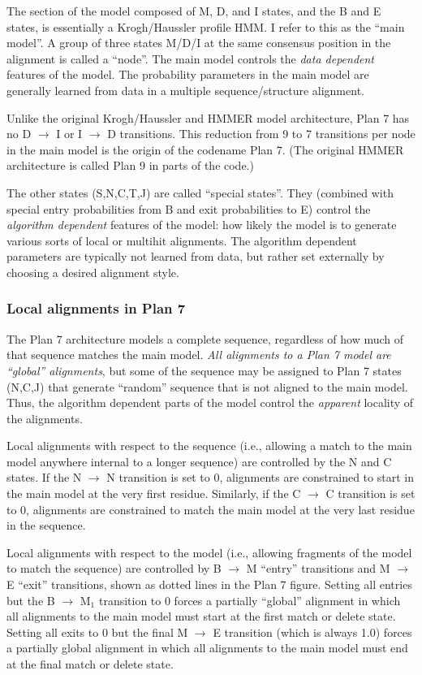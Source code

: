 The section of the model composed of M, D, and I states, and the B and
E states, is essentially a Krogh/Haussler profile HMM. I refer to this
as the ``main model''. A group of three states M/D/I at the same
consensus position in the alignment is called a ``node''. The main
model controls the \textit{data dependent} features of the model.  The
probability parameters in the main model are generally learned from
data in a multiple sequence/structure alignment.

Unlike the original Krogh/Haussler and HMMER model architecture, Plan
7 has no D $\rightarrow$ I or I $\rightarrow$ D transitions. This
reduction from 9 to 7 transitions per node in the main model is the
origin of the codename Plan 7. (The original HMMER architecture is
called Plan 9 in parts of the code.)

The other states (S,N,C,T,J) are called ``special states''. They
(combined with special entry probabilities from B and exit
probabilities to E) control the \textit{algorithm dependent} features
of the model: how likely the model is to generate various sorts of
local or multihit alignments. The algorithm dependent parameters are
typically not learned from data, but rather set externally by choosing
a desired alignment style.

\subsubsection{Local alignments in Plan 7}

The Plan 7 architecture models a complete sequence, regardless of how
much of that sequence matches the main model. \textit{All alignments
to a Plan 7 model are ``global'' alignments}, but some of the sequence
may be assigned to Plan 7 states (N,C,J) that generate ``random''
sequence that is not aligned to the main model.  Thus, the algorithm
dependent parts of the model control the \textit{apparent} locality of
the alignments.

Local alignments with respect to the sequence (i.e., allowing a match
to the main model anywhere internal to a longer sequence) are
controlled by the N and C states. If the N $\rightarrow$ N transition
is set to 0, alignments are constrained to start in the main model at
the very first residue. Similarly, if the C $\rightarrow$ C transition
is set to 0, alignments are constrained to match the main model at the
very last residue in the sequence.

Local alignments with respect to the model (i.e., allowing fragments
of the model to match the sequence) are controlled by B $\rightarrow$
M ``entry'' transitions and M $\rightarrow$ E ``exit'' transitions,
shown as dotted lines in the Plan 7 figure. Setting all entries but
the B $\rightarrow$ M$_1$ transition to 0 forces a partially
``global'' alignment in which all alignments to the main model must
start at the first match or delete state. Setting all exits to 0 but
the final M $\rightarrow$ E transition (which is always 1.0) forces a
partially global alignment in which all alignments to the main model
must end at the final match or delete state.

